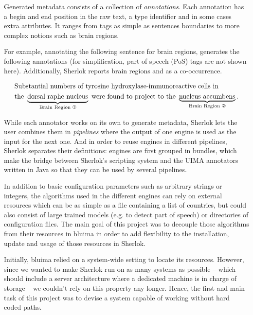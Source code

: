 \documentclass{article}
\newcommand{\ONEWC}{\ding{192}} %
\newcommand{\TWOWC}{\ding{193}} %
\newcommand{\UNDERBRACE}[2]{\underbrace{\text{#1}}_{\mathclap{\text{#2}}}}
\begin{document}
Generated metadata consists of a collection of \emph{annotations}. Each annotation has a begin and
end position in the raw text, a type identifier and in some cases extra attributes. It ranges from
tags as simple as sentences boundaries to more complex notions such as brain regions.

For example, annotating the following sentence for brain regions, generates the following
annotations (for simplification, part of speech (PoS) tags are not shown here). Additionally,
Sherlok reports brain regions \ONEWC\; and \TWOWC\; as a co-occurrence.

\begin{align*}
    & \text{Substantial numbers of tyrosine hydroxylase-immunoreactive cells in}\\
    & \text{the } \UNDERBRACE{dorsal raphe nucleus}{Brain Region \ONEWC}
      \text{ were found to project to the } \UNDERBRACE{nucleus accumbens}{Brain Region \TWOWC}
      \text{.}
\end{align*}

While each annotator works on its own to generate metadata, Sherlok lets the user combines them in
\emph{pipelines} where the output of one engine is used as the input for the next one. And in order
to reuse engines in different pipelines, Sherlok separates their definitions: engines are first
grouped in bundles, which make the bridge between Sherlok's scripting system and the UIMA annotators
written in Java so that they can be used by several pipelines.

In addition to basic configuration parameters such as arbitrary strings or integers, the algorithms
used in the different engines can rely on external resources which can be as simple as a file
containing a list of countries, but could also consist of large trained models (e.g. to detect part
of speech) or directories of configuration files. The main goal of this project was to decouple
those algorithms from their resources in bluima in order to add flexibility to the installation,
update and usage of those resources in Sherlok.

Initially, bluima relied on a system-wide setting to locate its resources. However, since we wanted
to make Sherlok run on as many systems as possible -- which should include a server architecture
where a dedicated machine is in charge of storage -- we couldn't rely on this property any longer.
Hence, the first and main task of this project was to devise a system capable of working without
hard coded paths.
\end{document}
